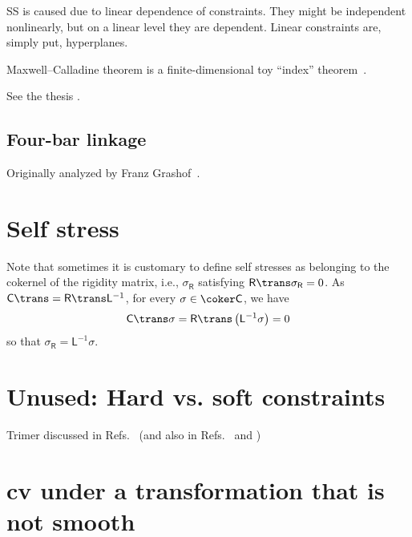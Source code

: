 SS is caused due to linear dependence of constraints.
They might be independent nonlinearly, but on a linear level they are dependent.
Linear constraints are, simply put, hyperplanes.

Maxwell--Calladine theorem is a finite-dimensional toy ``index'' theorem~\cite[\S 2.2]{nakahara2003}.

See the thesis \cite{lengyel2002}.

\subsection{Four-bar linkage}

Originally analyzed by Franz Grashof~\cite[pp.~113--118]{grashof1883}.

\section{Self stress}

Note that sometimes it is customary to define self stresses as belonging to the cokernel of the rigidity matrix, i.e., $\sigma_{\mathsf{R}}$ satisfying $\mathsf{R}\trans\sigma_{\mathsf{R}} = 0$.
As $\mathsf{C}\trans = \mathsf{R}\trans\mathsf{L}^{-1}$, for every $\sigma \in \coker\mathsf{C}$, we have
%
\begin{equation}
  \mathsf{C}\trans\sigma = \mathsf{R}\trans\left(\mathsf{L}^{-1}\mathsf{\sigma}\right) = 0
\end{equation}
%
so that $\sigma_{\mathsf{R}} = \mathsf{L}^{-1}\sigma$.




\section{Unused: Hard vs. soft constraints}

Trimer discussed in Refs.~\cite{kampen1981,kampen1984} (and also in Refs.~\cite[Section 15.1]{frenkel2001} and \cite{walter2011})

\section{\ac{cv} under a transformation that is not smooth}

